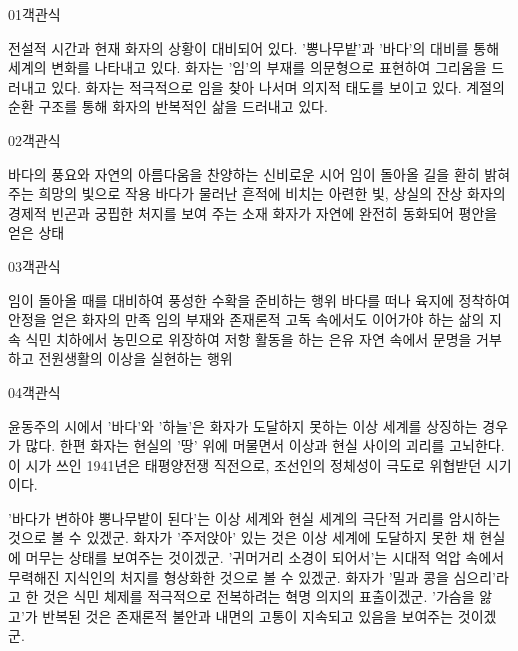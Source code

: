 \documentclass[fs85,seriesWit]{korfarm-base}
\begin{document}
\kfBeginMC
\begin{kfQBlock}{01}{객관식}
\begin{kfChoices}
\kfChoice 전설적 시간과 현재 화자의 상황이 대비되어 있다.
\kfChoice '뽕나무밭'과 '바다'의 대비를 통해 세계의 변화를 나타내고 있다.
\kfChoice 화자는 '임'의 부재를 의문형으로 표현하여 그리움을 드러내고 있다.
\kfChoice 화자는 적극적으로 임을 찾아 나서며 의지적 태도를 보이고 있다.
\kfChoice 계절의 순환 구조를 통해 화자의 반복적인 삶을 드러내고 있다.
\end{kfChoices}
\end{kfQBlock}

\begin{kfQBlock}{02}{객관식}
\begin{kfChoices}
\kfChoice 바다의 풍요와 자연의 아름다움을 찬양하는 신비로운 시어
\kfChoice 임이 돌아올 길을 환히 밝혀 주는 희망의 빛으로 작용
\kfChoice 바다가 물러난 흔적에 비치는 아련한 빛, 상실의 잔상
\kfChoice 화자의 경제적 빈곤과 궁핍한 처지를 보여 주는 소재
\kfChoice 화자가 자연에 완전히 동화되어 평안을 얻은 상태
\end{kfChoices}
\end{kfQBlock}

\begin{kfQBlock}{03}{객관식}
\begin{kfChoices}
\kfChoice 임이 돌아올 때를 대비하여 풍성한 수확을 준비하는 행위
\kfChoice 바다를 떠나 육지에 정착하여 안정을 얻은 화자의 만족
\kfChoice 임의 부재와 존재론적 고독 속에서도 이어가야 하는 삶의 지속
\kfChoice 식민 치하에서 농민으로 위장하여 저항 활동을 하는 은유
\kfChoice 자연 속에서 문명을 거부하고 전원생활의 이상을 실현하는 행위
\end{kfChoices}
\end{kfQBlock}

\begin{kfQBlock}{04}{객관식}
\begin{kfEvidence}윤동주의 시에서 '바다'와 '하늘'은 화자가 도달하지 못하는 이상 세계를 상징하는 경우가 많다. 한편 화자는 현실의 '땅' 위에 머물면서 이상과 현실 사이의 괴리를 고뇌한다. 이 시가 쓰인 1941년은 태평양전쟁 직전으로, 조선인의 정체성이 극도로 위협받던 시기이다.\end{kfEvidence}
\begin{kfChoices}
\kfChoice '바다가 변하야 뽕나무밭이 된다'는 이상 세계와 현실 세계의 극단적 거리를 암시하는 것으로 볼 수 있겠군.
\kfChoice 화자가 '주저앉아' 있는 것은 이상 세계에 도달하지 못한 채 현실에 머무는 상태를 보여주는 것이겠군.
\kfChoice '귀머거리 소경이 되어서'는 시대적 억압 속에서 무력해진 지식인의 처지를 형상화한 것으로 볼 수 있겠군.
\kfChoice 화자가 '밀과 콩을 심으리'라고 한 것은 식민 체제를 적극적으로 전복하려는 혁명 의지의 표출이겠군.
\kfChoice '가슴을 앓고'가 반복된 것은 존재론적 불안과 내면의 고통이 지속되고 있음을 보여주는 것이겠군.
\end{kfChoices}
\end{kfQBlock}
\end{document}
